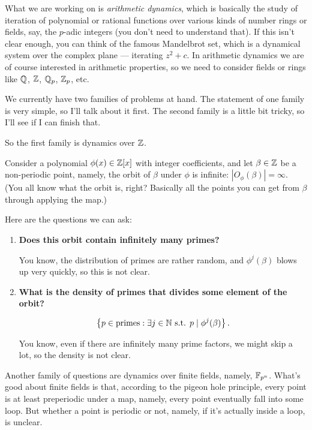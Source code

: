 

\renewcommand{\b}{\beta}
\newcommand{\N}{\mathbb{N}}



What we are working on is \emph{arithmetic dynamics}, which is
basically the study of iteration of polynomial or rational functions
over various kinds of number rings or fields, say, the $p$-adic
integers (you don't need to understand that). If this isn't clear
enough, you can think of the famous Mandelbrot set, which is a
dynamical system over the complex plane --- iterating $z^2 + c$. In
arithmetic dynamics we are of course interested in arithmetic
properties, so we need to consider fields or rings like $\mathbb{Q}$, $\mathbb{Z}$,
$\mathbb{Q}_p$, $\mathbb{Z}_p$, etc.

We currently have two families of problems at hand. The statement of
one family is very simple, so I'll talk about it first. The second
family is a little bit tricky, so I'll see if I can finish that.

So the first family is dynamics over $\mathbb{Z}$.

Consider a polynomial $\phi(x) \in \mathbb{Z}[x]$ with integer
coefficients, and let $\b \in \Z$ be a non-periodic point, namely,
the orbit of $\b$ under $\phi$ is infinite: $|O_\phi(\b)| =
\infty$. (You all know what the orbit is, right? Basically all the
points you can get from $\b$ through applying the map.)

Here are the questions we can ask:

\begin{enumerate}
\item \textbf{Does this orbit contain infinitely many primes?}

  You know, the distribution of primes are rather random, and
  $\phi^j(\b)$ blows up very quickly, so this is not clear.

\item \textbf{What is the density of primes that divides some element of the
  orbit?}

  \[
  \set{p \in \mathrm{primes} : \exists j \in \N \text{ s.t. } p \mid
    \phi^j(\b)}.
  \]

  You know, even if there are infinitely many prime factors, we might
  skip a lot, so the density is not clear.
\end{enumerate}

Another family of questions are dynamics over finite fields, namely,
$\mathbb{F}_{p^n}$. What's good about finite fields is that, according to the
pigeon hole principle, every point is at least preperiodic under a
map, namely, every point eventually fall into some loop. But whether
a point is periodic or not, namely, if it's actually inside a loop, is
unclear.

